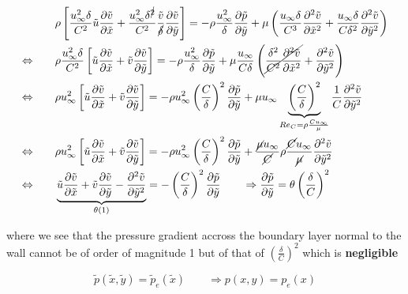 	\begin{equation}
	\begin{aligned}
		&\rho \left[ \frac{u_\infty ^2 \delta}{C^2}\tilde{u} \frac{\partial \tilde{v}}{\partial \tilde{x}} + \frac{u_\infty ^2 \delta^{\cancel{2}}}{C^2} \frac{\tilde{v}}{\cancel{\delta}}\frac{\partial \tilde{v}}{\partial \tilde{y}} \right] = -\rho \frac{u_\infty ^2}{\delta} \frac{\partial \tilde{p}}{\partial \tilde{y}} + \mu \left( \frac{u_\infty \delta}{C^3}\frac{\partial ^2 \tilde{v}}{\partial \tilde{x}^2} + \frac{u_\infty\delta}{C\delta ^{2}}\frac{\partial ^2 \tilde{v}}{\partial \tilde{y}^2} \right) \\
		\Leftrightarrow\qquad &\rho \frac{u_\infty ^2\delta}{C^2}\left[ \tilde{u} \frac{\partial \tilde{v}}{\partial \tilde{x}} +  \tilde{v} \frac{\partial \tilde{v}}{\partial \tilde{y}}  \right] = - \rho\frac{u_\infty ^2}{\delta} \frac{\partial \tilde{p}}{\partial \tilde{y}} +  \mu \frac{u_\infty }{C\delta} \left( \cancel{\frac{\delta ^2}{C^2}\frac{\partial ^2 \tilde{v}}{\partial \tilde{x}^2}}+ \frac{\partial ^2 \tilde{v}}{\partial \tilde{y}^2} \right) \\
		\Leftrightarrow\qquad  &\rho u_\infty ^2\left[ \tilde{u} \frac{\partial \tilde{v}}{\partial \tilde{x}} +  \tilde{v} \frac{\partial \tilde{v}}{\partial \tilde{y}}  \right] = - \rho u_\infty^2\left(\frac{C}{\delta}\right) ^2 \frac{\partial \tilde{p}}{\partial \tilde{y}} +  \mu u_\infty \underbrace{\left(\frac{C}{\delta}\right)^2}_{Re_C = \rho\frac{Cu_\infty}{\mu}} \frac{1}{C} \frac{\partial ^2 \tilde{v}}{\partial \tilde{y}^2}\\
		\Leftrightarrow\qquad  &\rho u_\infty ^2\left[ \tilde{u} \frac{\partial \tilde{v}}{\partial \tilde{x}} +  \tilde{v} \frac{\partial \tilde{v}}{\partial \tilde{y}}  \right] = - \rho u_\infty^2\left(\frac{C}{\delta}\right) ^2 \frac{\partial \tilde{p}}{\partial \tilde{y}} +  \frac{\cancel{\mu}u_\infty}{\cancel{C}} \rho\frac{\cancel{C}u_\infty}{\cancel{\mu}} \frac{\partial ^2 \tilde{v}}{\partial \tilde{y}^2}\\
				\Leftrightarrow\qquad  &\underbrace{\tilde{u} \frac{\partial \tilde{v}}{\partial \tilde{x}} +  \tilde{v} \frac{\partial \tilde{v}}{\partial \tilde{y}} -  \frac{\partial ^2 \tilde{v}}{\partial \tilde{y}^2}}_{\theta (1)} = - \left(\frac{C}{\delta}\right) ^2 \frac{\partial \tilde{p}}{\partial \tilde{y}} \qquad \Rightarrow \frac{\partial \tilde{p}}{\partial \tilde{y}} = \theta \left(\frac{\delta}{C}\right) ^2 
	\end{aligned}
	\end{equation}

	where we see that the pressure gradient accross the boundary layer normal to the wall cannot be of order of magnitude 1 but of that of $\left(\frac{\delta}{C}\right) ^2$ which is \textbf{negligible}

	\begin{equation}
		\tilde{p}(\tilde{x}, \tilde{y}) = \tilde{p}_e (\tilde{x}) \qquad \Rightarrow p(x,y) = p_e(x) 
	\end{equation}

